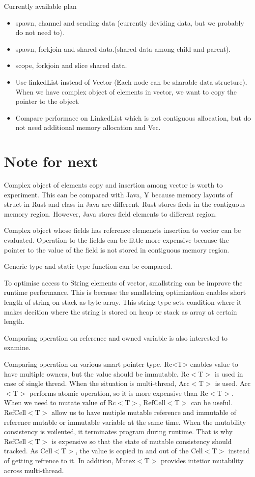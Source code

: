Currently available plan
\begin{itemize}
    \item spawn, channel and sending data (currently deviding data, but we probably do not need to).
    \item spawn, forkjoin and shared data.(shared data among child and parent).
    \item scope, forkjoin and slice shared data.
    \item Use linkedList instead of Vector (Each node can be sharable data structure). When we have complex object of elements in vector, we want to copy the pointer to the object.
    \item Compare performace on LinkedList which is not contiguous allocation, but do not need additional memory allocation and Vec.
\end{itemize}



\section{Note for next}
\label{sec:history}
Complex object of elements copy and insertion among vector is worth to experiment. This can be compared with Java, ¥
because memory layouts of struct in Rust and class in Java are different. Rust stores fieds in the contiguous memory region. 
However, Java stores field elements to different region.

Complex object whose fields has reference elemenets insertion to vector can be evaluated. Operation to the fields can be little 
more expensive because the pointer to the value of the field is not stored in contiguous memory region.

Generic type and static type function can be compared. 

To optimise access to String elements of vector, smallstring can be improve the runtime performance. 
This is because the smallstring optimization enables short length of string on stack as byte array. 
This string type sets condition where it makes decition where the string is stored on heap or stack as array at certain length.

Comparing operation on reference and owned variable is also interested to examine.

Comparing operation on various smart pointer type. 
Rc<T> enables value to have multiple owners, but the value should be immutable. Rc$<$T$>$ is used in case of single thread. 
When the situation is multi-thread, Arc$<$T$>$ is used. Arc$<$T$>$ performs atomic operation, so it is more expensive than Rc$<$T$>$. 
When we need to mutate value of Rc$<$T$>$, RefCell$<$T$>$ can be useful. RefCell$<$T$>$ allow us to have mutiple mutable reference and immutable
of reference mutable or immutable variable at the same time. When the mutability consistency is voilented, it terminates program during runtime. 
That is why RefCell$<$T$>$ is expensive so that the state of mutable consistency should tracked. 
As Cell$<$T$>$, the value is copied in and out of the Cell$<$T$>$ instead of getting refrence to it. 
In addition, Mutex$<$T$>$ provides intetior mutability across multi-thread.

